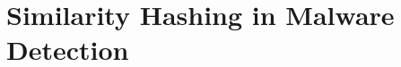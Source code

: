 \documentclass[../main.tex]{subfiles}
\begin{document}

    
    


\section{Similarity Hashing in Malware Detection}



\end{document}
